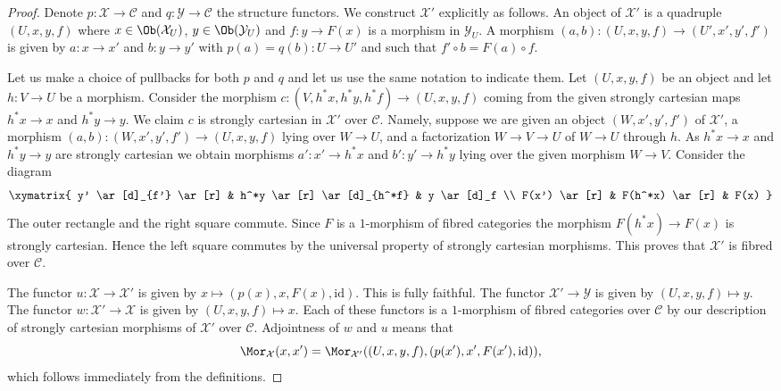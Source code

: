 \begin{proof}
Denote $p : \mathcal{X} \to \mathcal{C}$ and $q : \mathcal{Y} \to \mathcal{C}$
the structure functors. We construct $\mathcal{X}'$ explicitly as follows.
An object of $\mathcal{X}'$ is a quadruple $(U, x, y, f)$ where
$x \in \Ob(\mathcal{X}_U)$, $y \in \Ob(\mathcal{Y}_U)$
and $f : y \to F(x)$ is a morphism in $\mathcal{Y}_U$.
A morphism $(a, b) : (U, x, y, f) \to (U', x', y', f')$ is given
by $a : x \to x'$ and $b : y \to y'$ with $p(a) = q(b) : U \to U'$
and such that $f' \circ b = F(a) \circ f$.

\medskip\noindent
Let us make a choice of pullbacks for both $p$ and $q$ and let us
use the same notation to indicate them.
Let $(U, x, y, f)$ be an object and let $h : V \to U$ be a morphism.
Consider the morphism $c : (V, h^*x, h^*y, h^*f) \to (U, x, y, f)$
coming from the given strongly cartesian maps $h^*x \to x$ and $h^*y \to y$.
We claim $c$ is strongly cartesian in $\mathcal{X}'$ over $\mathcal{C}$.
Namely, suppose we are given an object $(W, x', y', f')$ of $\mathcal{X}'$,
a morphism $(a, b) : (W, x', y', f') \to (U, x, y, f)$ lying over
$W \to U$, and a factorization $W \to V \to U$ of $W \to U$ through $h$.
As $h^*x \to x$ and $h^*y \to y$ are strongly cartesian we obtain morphisms
$a' : x' \to h^*x$ and $b' : y' \to h^*y$ lying over the given morphism
$W \to V$. Consider the diagram
$$
\xymatrix{
y' \ar[d]_{f'} \ar[r] & h^*y \ar[r] \ar[d]_{h^*f} & y \ar[d]_f \\
F(x') \ar[r] & F(h^*x) \ar[r] & F(x)
}
$$
The outer rectangle and the right square commute.
Since $F$ is a $1$-morphism of fibred categories the morphism
$F(h^*x) \to F(x)$ is strongly cartesian.
Hence the left square commutes by the universal property
of strongly cartesian morphisms. This proves that $\mathcal{X}'$
is fibred over $\mathcal{C}$.

\medskip\noindent
The functor $u : \mathcal{X} \to \mathcal{X}'$ is given by
$x \mapsto (p(x), x, F(x), \text{id})$. This is fully faithful.
The functor $\mathcal{X}' \to \mathcal{Y}$ is given by
$(U, x, y, f) \mapsto y$. The functor $w : \mathcal{X}' \to \mathcal{X}$
is given by $(U, x, y, f) \mapsto x$. Each of these functors is
a $1$-morphism of fibred categories over $\mathcal{C}$ by our
description of strongly cartesian morphisms of $\mathcal{X}'$ over
$\mathcal{C}$. Adjointness of $w$ and $u$ means that
$$
\Mor_\mathcal{X}(x, x') =
\Mor_{\mathcal{X}'}((U, x, y, f), (p(x'), x', F(x'), \text{id})),
$$
which follows immediately from the definitions.


\end{proof}
